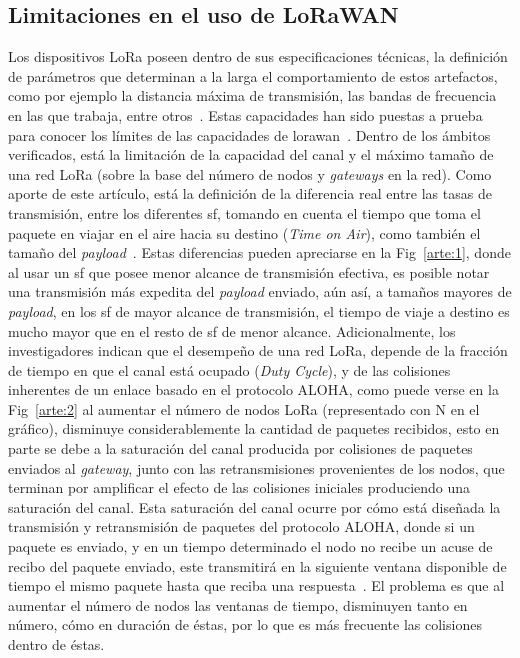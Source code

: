 \begin{justify}
\section{Limitaciones en el uso de LoRaWAN}
Los dispositivos LoRa poseen dentro de sus especificaciones técnicas, la definición de parámetros que determinan a la larga el comportamiento de estos artefactos, como por ejemplo la distancia máxima de transmisión, las bandas de frecuencia en las que trabaja, entre otros~\cite{orange}. Estas capacidades han sido puestas a prueba para conocer los límites de las capacidades de \gls{lorawan}~\cite{Xavier}. Dentro de los ámbitos verificados, está la limitación de la capacidad del canal y el máximo tamaño de una red LoRa (sobre la base del número de nodos y \textit{gateways} en la red). Como aporte de este artículo, está la definición de la diferencia real entre las tasas de transmisión, entre los diferentes \gls{sf}, tomando en cuenta el tiempo que toma el paquete en viajar en el aire hacia su destino (\textit{Time on Air}), como también el tamaño del \textit{payload}~\cite{Xavier}. Estas diferencias pueden apreciarse en la Fig~\ref{arte:1}, donde al usar un \gls{sf} que posee menor alcance de transmisión efectiva, es posible notar una transmisión más expedita del \textit{payload} enviado, aún así, a tamaños mayores de \textit{payload}, en los \gls{sf} de mayor alcance de transmisión, el tiempo de viaje a destino es mucho mayor que en el resto de \gls{sf} de menor alcance. Adicionalmente, los investigadores indican que el desempeño de una red LoRa, depende de la fracción de tiempo en que el canal está ocupado (\textit{Duty Cycle}), y de las colisiones inherentes de un enlace basado en el protocolo ALOHA, como puede verse en la Fig~\ref{arte:2} al aumentar el número de nodos LoRa (representado con N en el gráfico), disminuye considerablemente la cantidad de paquetes recibidos, esto en parte se debe a la saturación del canal producida por colisiones de paquetes enviados al \textit{gateway}, junto con las retransmisiones provenientes de los nodos, que terminan por amplificar el efecto de las colisiones iniciales produciendo una saturación del canal. Esta saturación del canal ocurre por cómo está diseñada la transmisión y retransmisión de paquetes del protocolo ALOHA, donde si un paquete es enviado, y en un tiempo determinado el nodo no recibe un acuse de recibo del paquete enviado, este transmitirá en la siguiente ventana disponible de tiempo el mismo paquete hasta que reciba una respuesta~\cite{NORMAN}. El problema es que al aumentar el número de nodos las ventanas de tiempo, disminuyen tanto en número, cómo en duración de éstas, por lo que es más frecuente las colisiones dentro de éstas.\\

\end{justify}
